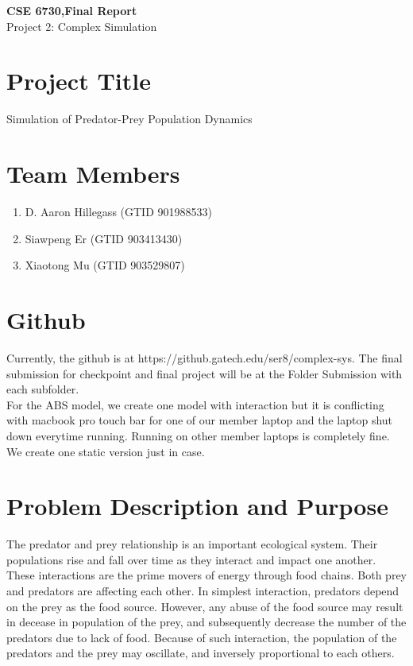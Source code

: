 \documentclass{article}
\begin{document}
	\begin{center}
		
		\LARGE{\textbf{CSE 6730,Final Report}} \\
		\vspace{1em}
		\Large{Project 2: Complex Simulation} \\
		
	\end{center}
	\begin{normalsize}
		
		\section{Project Title}
		
		Simulation of Predator-Prey Population Dynamics 
		
		\section{Team Members}
		
		\begin{enumerate}
			\item D. Aaron Hillegass (GTID 901988533)
			\item Siawpeng Er (GTID 903413430)
			\item Xiaotong Mu (GTID 903529807)
		\end{enumerate}
	
		\section{Github}
		Currently, the github is at https://github.gatech.edu/ser8/complex-sys.
		The final submission for checkpoint and final project will be at the Folder Submission with each subfolder.\\
		For the ABS model, we create one model with interaction but it is conflicting with macbook pro touch bar for one of our member laptop and the laptop shut down everytime running. Running on other member laptops is completely fine. \\
		We create one static version just in case.
		
		\section{Problem Description and Purpose}
		The predator and prey relationship is an important ecological system. Their populations rise and fall over time as they interact and impact one another. These interactions are the prime movers of energy through food chains. Both prey and predators are affecting each other. \cite{laham_2012_a}In simplest interaction, predators depend on the prey as the food source. However, any abuse of the food source may result in decease in population of the prey, and subsequently decrease the number of the predators due to lack of food. Because of such interaction, the population of the predators and the prey may oscillate, and inversely proportional to each others.\cite{obaid_2013_the}\
		

\end{normalsize}
\end{document}
